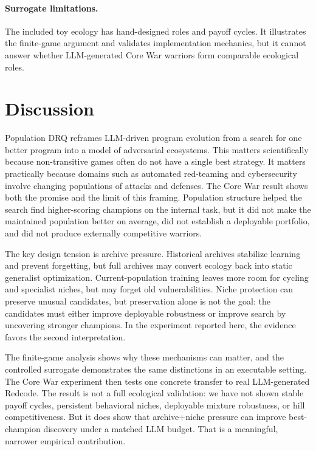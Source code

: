 \documentclass[11pt]{article}
\begin{document}
\paragraph{Surrogate limitations.}
The included toy ecology has hand-designed roles and payoff cycles. It illustrates the finite-game argument and validates implementation mechanics, but it cannot answer whether LLM-generated Core War warriors form comparable ecological roles.

\section{Discussion}

Population DRQ reframes LLM-driven program evolution from a search for one better program into a model of adversarial ecosystems. This matters scientifically because non-transitive games often do not have a single best strategy. It matters practically because domains such as automated red-teaming and cybersecurity involve changing populations of attacks and defenses. The Core War result shows both the promise and the limit of this framing. Population structure helped the search find higher-scoring champions on the internal task, but it did not make the maintained population better on average, did not establish a deployable portfolio, and did not produce externally competitive warriors.

The key design tension is archive pressure. Historical archives stabilize learning and prevent forgetting, but full archives may convert ecology back into static generalist optimization. Current-population training leaves more room for cycling and specialist niches, but may forget old vulnerabilities. Niche protection can preserve unusual candidates, but preservation alone is not the goal: the candidates must either improve deployable robustness or improve search by uncovering stronger champions. In the experiment reported here, the evidence favors the second interpretation.

The finite-game analysis shows why these mechanisms can matter, and the controlled surrogate demonstrates the same distinctions in an executable setting. The Core War experiment then tests one concrete transfer to real LLM-generated Redcode. The result is not a full ecological validation: we have not shown stable payoff cycles, persistent behavioral niches, deployable mixture robustness, or hill competitiveness. But it does show that archive+niche pressure can improve best-champion discovery under a matched LLM budget. That is a meaningful, narrower empirical contribution.
\end{document}
